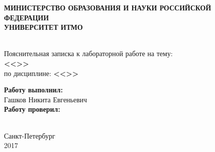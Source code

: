 \documentclass[../main/main.tex]{subfiles}
\begin{document}
    \begin{titlepage}
        \begin{center}
            \textbf{МИНИСТЕРСТВО ОБРАЗОВАНИЯ И НАУКИ РОССИЙСКОЙ ФЕДЕРАЦИИ} \\ \smallskip
            \textbf{УНИВЕРСИТЕТ ИТМО} \\ \smallskip
            \textbf{} \\
        \end{center} \vfill
        \begin{center}
            Пояснительная записка к лабораторной работе \textnumero на тему: \\ \smallskip
            \textbf{\Large <<>>} \\ \smallskip
            по дисциплине: \textbf{<<>>} \\
        \end{center} \vspace{10em}
        \begin{flushright}
            \textbf{Работу выполнил:} \\
            Гашков Никита Евгеньевич \\ \smallskip
            \textbf{Работу проверил:} \\
            \\
        \end{flushright} \vfill
        \begin{center}
            Санкт-Петербург \\
            2017
        \end{center}
    \end{titlepage}
\end{document}
